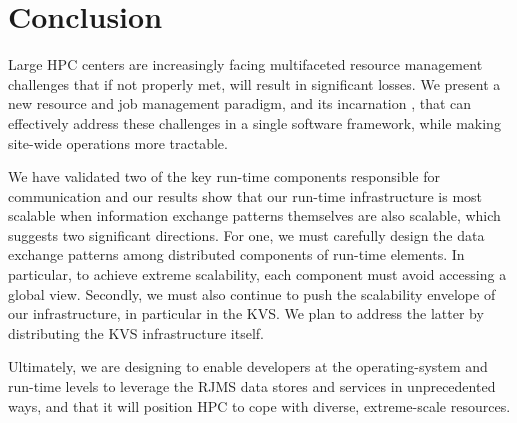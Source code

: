 \section{Conclusion}
Large HPC centers are increasingly facing 
multifaceted resource management challenges
that if not properly met, will result 
in significant losses.  
We present a new resource and job
management paradigm, and its incarnation \flux, that can effectively
address these challenges in a single software framework,
while making site-wide operations more tractable.

We have validated two of the key run-time components responsible for communication
and our results show that our run-time 
infrastructure is most scalable when information 
exchange patterns themselves are also scalable, which suggests two significant directions. 
For one, we must carefully design the data exchange patterns
among distributed components of run-time elements. 
In particular, to achieve extreme scalability, each component 
must avoid accessing a global view.
Secondly, we must also continue to push the 
scalability envelope of our infrastructure, in particular in the
KVS. We plan to address the latter by 
distributing the KVS infrastructure itself.
%

Ultimately, we are designing \flux to  
enable developers at the operating-system and
run-time levels to leverage the RJMS data stores and services in
unprecedented ways, and that it will position HPC to cope
with diverse, extreme-scale resources.
